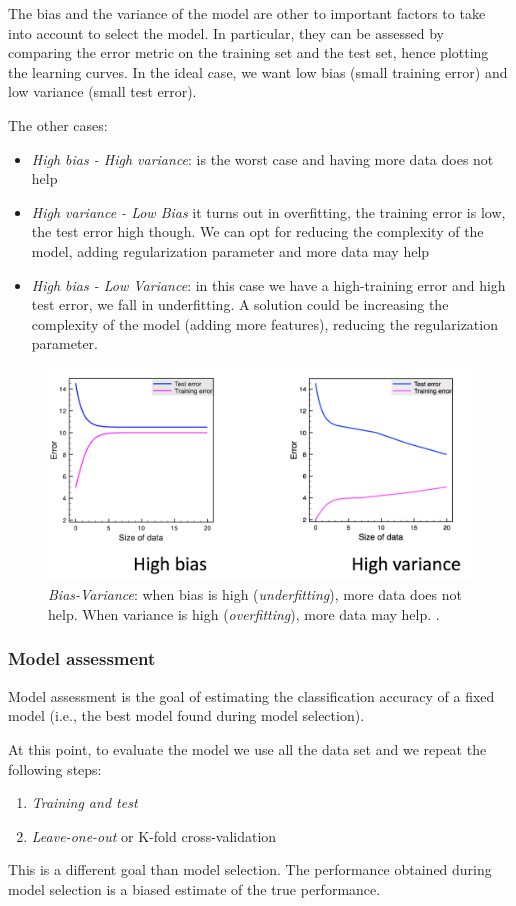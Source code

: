 The bias and the variance of the model are other to important factors to take into account to select the model. In particular, they can be assessed by comparing the error metric on the training set and the test set, hence plotting the learning curves. In the ideal case, we want low bias (small training error) and low variance (small test error).

The other cases:
\begin{itemize}
\item \emph{High bias - High variance}: is the worst case and having more data does not help

\item \emph{High variance - Low Bias} it turns out in overfitting, the training error is low, the test error high though. We can opt for reducing the complexity of the model, adding regularization parameter and more data may help

\item \emph{High bias - Low Variance}: in this case we have a high-training error and high test error, we fall in underfitting. A solution could be increasing the complexity of the model (adding more features), reducing the regularization parameter.
\end{itemize}

\begin{figure}[H]%
 \centering
 \includegraphics[width=13cm]{./img/08/bias_variance}
 \caption{\label{pic:bias_variance} \emph{Bias-Variance}: when bias is high (\emph{underfitting}), more data does not help. When variance is high (\emph{overfitting}), more data may help.
.}
\end{figure}

\subsubsection{Model assessment}

Model assessment is the goal of estimating the classification accuracy of a fixed model (i.e., the best model found during model selection).

At this point, to evaluate the model we use all the data set and we repeat the following steps:
\begin{enumerate}
\item \emph{Training and test}
\item \emph{Leave-one-out} or {K-fold cross-validation}
\end{enumerate}

This is a different goal than model selection. The performance obtained during model selection is a biased estimate of the true performance.